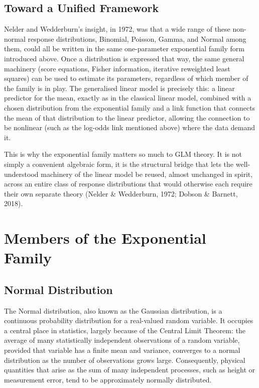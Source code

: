 \documentclass[12pt,a4paper]{report}
\begin{document}
\subsection*{Toward a Unified Framework}

Nelder and Wedderburn's insight, in 1972, was that a wide range of these non-normal response distributions, Binomial, Poisson, Gamma, and Normal among them, could all be written in the same one-parameter exponential family form introduced above. Once a distribution is expressed that way, the same general machinery (score equations, Fisher information, iterative reweighted least squares) can be used to estimate its parameters, regardless of which member of the family is in play. The generalised linear model is precisely this: a linear predictor for the mean, exactly as in the classical linear model, combined with a chosen distribution from the exponential family and a link function that connects the mean of that distribution to the linear predictor, allowing the connection to be nonlinear (such as the log-odds link mentioned above) where the data demand it.

This is why the exponential family matters so much to GLM theory. It is not simply a convenient algebraic form, it is the structural bridge that lets the well-understood machinery of the linear model be reused, almost unchanged in spirit, across an entire class of response distributions that would otherwise each require their own separate theory (Nelder \& Wedderburn, 1972; Dobson \& Barnett, 2018).

\section{Members of the Exponential Family}
\subsection{Normal Distribution}

The Normal distribution, also known as the Gaussian distribution, is a continuous probability distribution for a real-valued random variable. It occupies a central place in statistics, largely because of the Central Limit Theorem: the average of many statistically independent observations of a random variable, provided that variable has a finite mean and variance, converges to a normal distribution as the number of observations grows large. Consequently, physical quantities that arise as the sum of many independent processes, such as height or measurement error, tend to be approximately normally distributed.
\end{document}
